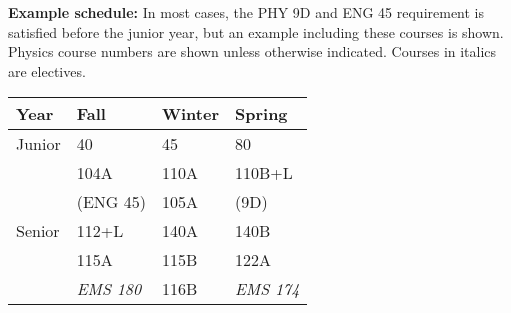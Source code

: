 \documentclass[12pt]{article}
\begin{document}
\noindent
{\bf Example schedule:} In most cases, the PHY 9D and ENG 45 requirement is
satisfied before the junior year, but an example including these courses is
shown.  Physics course numbers are shown unless otherwise indicated.
Courses in italics are electives.
\begin{center}
\begin{tabular}{|l|l|l|l|}
\hline
Year      & Fall    & Winter & Spring \\
\hline
Junior    & 40         & 45           & 80 \\
          & 104A       & 110A         & 110B+L \\
          & (ENG 45)   & 105A         & (9D) \\         
\hline
Senior   & 112+L          & 140A   & 140B \\
         & 115A           & 115B   & 122A \\
         & {\it EMS 180}  & 116B   & {\it EMS 174} \\
\hline
\end{tabular}
\end{center}
\end{document}
